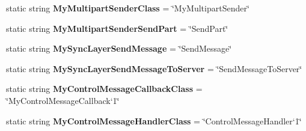 \begin{DoxyCompactItemize}
\item 
\hypertarget{class_s_e_mod_a_p_i_internal_1_1_a_p_i_1_1_server_1_1_server_network_manager_a30930c6c31f33be088cac87a3cae54c2}{}static string {\bfseries My\+Multipart\+Sender\+Class} = \char`\"{}My\+Multipart\+Sender\char`\"{}\label{class_s_e_mod_a_p_i_internal_1_1_a_p_i_1_1_server_1_1_server_network_manager_a30930c6c31f33be088cac87a3cae54c2}

\item 
\hypertarget{class_s_e_mod_a_p_i_internal_1_1_a_p_i_1_1_server_1_1_server_network_manager_aeb3c5324ce6a18ec0ba65dad9ee9aca5}{}static string {\bfseries My\+Multipart\+Sender\+Send\+Part} = \char`\"{}Send\+Part\char`\"{}\label{class_s_e_mod_a_p_i_internal_1_1_a_p_i_1_1_server_1_1_server_network_manager_aeb3c5324ce6a18ec0ba65dad9ee9aca5}

\item 
\hypertarget{class_s_e_mod_a_p_i_internal_1_1_a_p_i_1_1_server_1_1_server_network_manager_abea0dc92e57150a31810c655bc3c25cb}{}static string {\bfseries My\+Sync\+Layer\+Send\+Message} = \char`\"{}Send\+Message\char`\"{}\label{class_s_e_mod_a_p_i_internal_1_1_a_p_i_1_1_server_1_1_server_network_manager_abea0dc92e57150a31810c655bc3c25cb}

\item 
\hypertarget{class_s_e_mod_a_p_i_internal_1_1_a_p_i_1_1_server_1_1_server_network_manager_a6918c63160c8480364486b45b71b79a8}{}static string {\bfseries My\+Sync\+Layer\+Send\+Message\+To\+Server} = \char`\"{}Send\+Message\+To\+Server\char`\"{}\label{class_s_e_mod_a_p_i_internal_1_1_a_p_i_1_1_server_1_1_server_network_manager_a6918c63160c8480364486b45b71b79a8}

\item 
\hypertarget{class_s_e_mod_a_p_i_internal_1_1_a_p_i_1_1_server_1_1_server_network_manager_a18de66facaf04ed287616e1632eba604}{}static string {\bfseries My\+Control\+Message\+Callback\+Class} = \char`\"{}My\+Control\+Message\+Callback`1\char`\"{}\label{class_s_e_mod_a_p_i_internal_1_1_a_p_i_1_1_server_1_1_server_network_manager_a18de66facaf04ed287616e1632eba604}

\item 
\hypertarget{class_s_e_mod_a_p_i_internal_1_1_a_p_i_1_1_server_1_1_server_network_manager_af09ac9d723dfb88db34a9a27e7d021ad}{}static string {\bfseries My\+Control\+Message\+Handler\+Class} = \char`\"{}Control\+Message\+Handler`1\char`\"{}\label{class_s_e_mod_a_p_i_internal_1_1_a_p_i_1_1_server_1_1_server_network_manager_af09ac9d723dfb88db34a9a27e7d021ad}

\end{DoxyCompactItemize}
